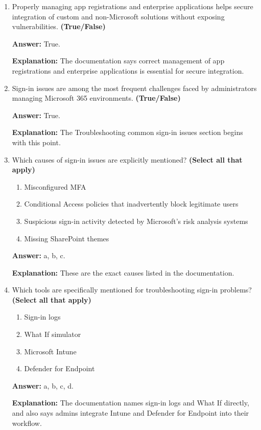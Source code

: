 \documentclass[10pt]{article}
\begin{document}
\begin{enumerate}[leftmargin=*]
\textbf{Explanation:} These are the exact benefits assigned to proactive monitoring in the introduction.

\item Properly managing app registrations and enterprise applications helps secure integration of custom and non-Microsoft solutions without exposing vulnerabilities. \textbf{(True/False)}

\textbf{Answer:} True.

\textbf{Explanation:} The documentation says correct management of app registrations and enterprise applications is essential for secure integration.

\item Sign-in issues are among the most frequent challenges faced by administrators managing Microsoft 365 environments. \textbf{(True/False)}

\textbf{Answer:} True.

\textbf{Explanation:} The Troubleshooting common sign-in issues section begins with this point.

\item Which causes of sign-in issues are explicitly mentioned? \textbf{(Select all that apply)}
\begin{enumerate}[label=\alph*., leftmargin=1.5em]
\item Misconfigured MFA
\item Conditional Access policies that inadvertently block legitimate users
\item Suspicious sign-in activity detected by Microsoft’s risk analysis systems
\item Missing SharePoint themes
\end{enumerate}
\textbf{Answer:} a, b, c.

\textbf{Explanation:} These are the exact causes listed in the documentation.

\item Which tools are specifically mentioned for troubleshooting sign-in problems? \textbf{(Select all that apply)}
\begin{enumerate}[label=\alph*., leftmargin=1.5em]
\item Sign-in logs
\item What If simulator
\item Microsoft Intune
\item Defender for Endpoint
\end{enumerate}
\textbf{Answer:} a, b, c, d.

\textbf{Explanation:} The documentation names sign-in logs and What If directly, and also says admins integrate Intune and Defender for Endpoint into their workflow.


\end{enumerate}
\end{document}
